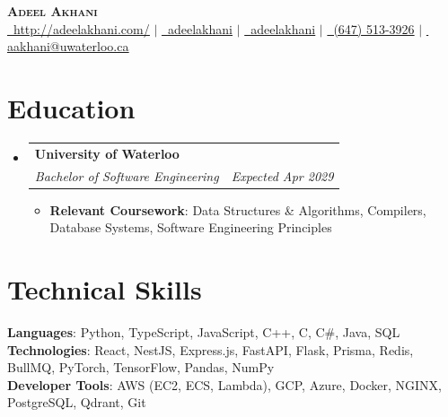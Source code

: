 \documentclass[letterpaper,11pt]{article}
\makeatletter
\newcommand{\resumeItem}[1]{
  \item\small{
    {#1 \vspace{-2pt}}
  }
}
\newcommand{\resumeSubheading}[4]{
  \vspace{-2pt}\item
    \begin{tabular*}{0.97\textwidth}[t]{l@{\extracolsep{\fill}}r}
      \textbf{#1} & #2 \\
      \textit{\small#3} & \textit{\small #4} \\
    \end{tabular*}\vspace{-7pt}
}
\newcommand{\resumeSubHeadingListStart}{\begin{itemize}[leftmargin=0.15in, label={}]}
\newcommand{\resumeSubHeadingListEnd}{\end{itemize}}
\newcommand{\resumeItemListStart}{\begin{itemize}}
\newcommand{\resumeItemListEnd}{\end{itemize}\vspace{-5pt}}
\makeatother
\begin{document}
\begin{center}
    \textbf{\Huge \scshape Adeel Akhani} \\ \vspace{1pt}
    \small
    \href{http://adeelakhani.com/}{\faGlobe\, \underline{http://adeelakhani.com/}} $|$
    \href{https://www.linkedin.com/in/adeelakhani/}{\faLinkedin\, \underline{adeelakhani}} $|$ 
    \href{https://github.com/adeelakhani}{\faGithub\, \underline{adeelakhani}} $|$
    \href{tel:(647) 513-3926}{\faMobile*\, (647) 513-3926} $|$
    \href{mailto:aakhani@uwaterloo.ca}{\faEnvelope\, \underline{aakhani@uwaterloo.ca}}
\end{center}
\section{Education}
    \resumeSubHeadingListStart
        \resumeSubheading
            {University of Waterloo}{}
            {Bachelor of Software Engineering}{\textit{Expected Apr 2029}}
            \resumeItemListStart
                \resumeItem{\textbf{Relevant Coursework}: Data Structures \& Algorithms, Compilers, Database Systems, Software Engineering Principles}
            \resumeItemListEnd
        \resumeSubHeadingListEnd
\section{Technical Skills}
\begin{itemize}[leftmargin=0.15in, label={}]
    \small{\item{
    \textbf{Languages}{: Python, TypeScript, JavaScript, C++, C, C\#, Java, SQL} \\
    \textbf{Technologies}{: React, NestJS, Express.js, FastAPI, Flask, Prisma, Redis, BullMQ, PyTorch, TensorFlow, Pandas, NumPy} \\
    \textbf{Developer Tools}{: AWS (EC2, ECS, Lambda), GCP, Azure, Docker, NGINX, PostgreSQL, Qdrant, Git} 
    }}
\end{itemize}
\end{document}
